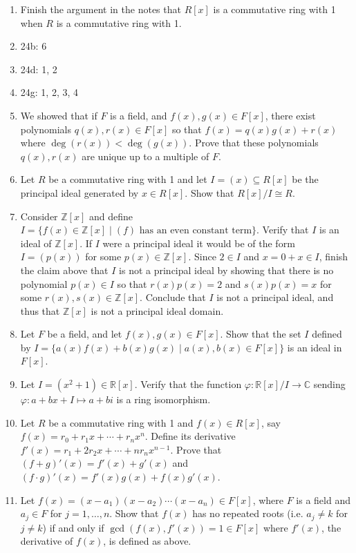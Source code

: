 \documentclass[12pt,letterpaper,DIV=11,final]{scrartcl}
\theoremstyle{plain}
\theoremstyle{definition}
\theoremstyle{remark}
\begin{document}
\begin{enumerate}
  \item Finish the argument in the notes that $R[x]$ is a commutative ring with 1 when $R$ is a commutative ring with 1.
  \item 24b: 6
  \item 24d: 1, 2
  \item 24g: 1, 2, 3, 4
  \item We showed that if $F$ is a field, and $f(x), g(x) \in F[x]$, there exist polynomials $q(x), r(x) \in F[x]$ so that $f(x) = q(x) g(x) + r(x)$ where $\deg(r(x)) < \deg(g(x))$.
    Prove that these polynomials $q(x), r(x)$ are unique up to a multiple of $F$.
  \item Let $R$ be a commutative ring with 1 and let $I = (x) \subseteq R[x]$ be the principal ideal generated by $x \in R[x]$.
    Show that $R[x] / I \cong R$.

  \item Consider $\mathbb{Z}[x]$ and define $I = \{ f(x) \in \mathbb{Z}[x] \mid (f) \text{ has an even constant term} \}$.
    Verify that $I$ is an ideal of $\mathbb{Z}[x]$.
    If $I$ were a principal ideal it would be of the form $I = \left( p(x) \right)$ for some $p(x) \in \mathbb{Z}[x]$.
    Since $2 \in I$ and $x = 0 + x \in I$, finish the claim above that $I$ is not a principal ideal by showing that there is no polynomial $p(x) \in I$ so that $r(x) p(x) = 2$ and $s(x) p(x) = x$ for some $r(x), s(x) \in \mathbb{Z}[x]$.
    Conclude that $I$ is not a principal ideal, and thus that $\mathbb{Z}[x]$ is not a principal ideal domain.
  \item Let $F$ be a field, and let $f(x), g(x) \in F[x]$.
    Show that the set $I$ defined by $I = \{ a(x) f(x) + b(x) g(x) \mid a(x), b(x) \in F[x] \}$ is an ideal in $F[x]$.
  \item Let $I = (x^2 + 1) \in \mathbb{R}[x]$.
    Verify that the function $\varphi : \mathbb{R}[x]/I \to \mathbb{C}$ sending $\varphi : a + bx + I \mapsto a + bi$ is a ring isomorphism.
  \item Let $R$ be a commutative ring with 1 and $f(x) \in R[x]$, say $f(x) = r_0 + r_1 x + \cdots + r_n x^n$.
    Define its derivative $f'(x) = r_1 + 2r_2 x + \cdots + n r_n x^{n - 1}$.
    Prove that $(f + g)'(x) = f'(x) + g'(x)$ and $(f \cdot g)'(x) = f'(x) g(x) + f(x) g'(x)$.
  \item Let $f(x) = (x - a_1) (x - a_2) \cdots (x - a_n) \in F[x]$, where $F$ is a field and $a_j \in F$ for $j = 1, \dots, n$.
    Show that $f(x)$ has no repeated roots (i.e. $a_j \neq k$ for $j \neq k$) if and only if $\gcd(f(x), f'(x)) = 1 \in F[x]$ where $f'(x)$, the derivative of $f(x)$, is defined as above.
\end{enumerate}
\end{document}
